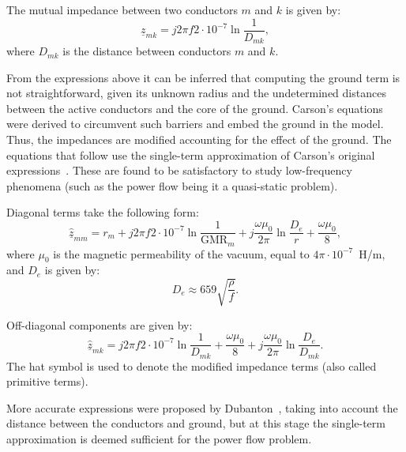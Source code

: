 \documentclass[11pt]{article}
\begin{document}
	The mutual impedance between two conductors $m$ and $k$ is given by:
	\begin{equation}
		\underline{z}_{mk} = j 2\pi f 2\cdot 10^{-7} \ln \frac{1}{D_{mk}},
	\end{equation}
	where $D_{mk}$ is the distance between conductors $m$ and $k$. 

	From the expressions above it can be inferred that computing the ground term is not straightforward, given its unknown radius and the undetermined distances between the active conductors and the core of the ground. Carson's equations were derived to circumvent such barriers and embed the ground in the model. Thus, the impedances are modified accounting for the effect of the ground. The equations that follow use the single-term approximation of Carson's original expressions~\cite{krolo2018computation}. These are found to be satisfactory to study low-frequency phenomena (such as the power flow being it a quasi-static problem). 
	
	Diagonal terms take the following form:
		\begin{equation}
			\underline{\hat{z}}_{mm} = r_m + j 2\pi f 2\cdot 10^{-7} \ln \frac{1}{\text{GMR}_m} + j\frac{\omega \mu_0}{2\pi}\ln \frac{D_e}{r} + \frac{\omega \mu_0}{8}, 
	\end{equation}
	where $\mu_0$ is the magnetic permeability of the vacuum, equal to $4\pi \cdot 10^{-7}$~H/m, and $D_e$ is given by:
	\begin{equation}
		D_e \approx 659 \sqrt{\frac{\rho}{f}}.
	\end{equation}

	Off-diagonal components are given by:	
	\begin{equation}
		\underline{\hat{z}}_{mk} = j 2\pi f 2\cdot 10^{-7} \ln \frac{1}{D_{mk}} + \frac{\omega \mu_0}{8} + j \frac{\omega \mu_0}{2\pi} \ln \frac{D_e}{D_{mk}}.
	\end{equation}
	The hat symbol is used to denote the modified impedance terms (also called primitive terms).

	More accurate expressions were proposed by Dubanton~\cite{dubanton1969calcul}, taking into account the distance between the conductors and ground, but at this stage the single-term approximation is deemed sufficient for the power flow problem.	
\end{document}
